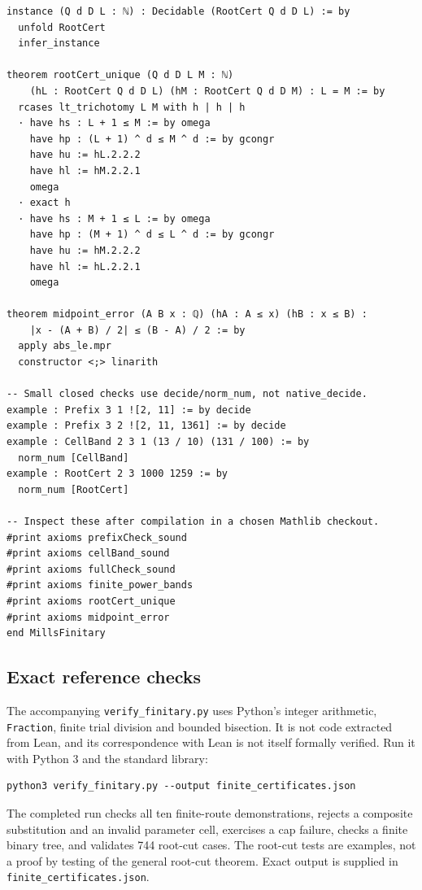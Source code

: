 \documentclass[11pt,reqno]{amsart}
\theoremstyle{blueplain}
\numberwithin{equation}{section}
\begin{document}
\begin{lstlisting}[style=lean,basicstyle=\ttfamily\scriptsize,numberstyle=\scriptsize]
instance (Q d D L : ℕ) : Decidable (RootCert Q d D L) := by
  unfold RootCert
  infer_instance

theorem rootCert_unique (Q d D L M : ℕ)
    (hL : RootCert Q d D L) (hM : RootCert Q d D M) : L = M := by
  rcases lt_trichotomy L M with h | h | h
  · have hs : L + 1 ≤ M := by omega
    have hp : (L + 1) ^ d ≤ M ^ d := by gcongr
    have hu := hL.2.2.2
    have hl := hM.2.2.1
    omega
  · exact h
  · have hs : M + 1 ≤ L := by omega
    have hp : (M + 1) ^ d ≤ L ^ d := by gcongr
    have hu := hM.2.2.2
    have hl := hL.2.2.1
    omega

theorem midpoint_error (A B x : ℚ) (hA : A ≤ x) (hB : x ≤ B) :
    |x - (A + B) / 2| ≤ (B - A) / 2 := by
  apply abs_le.mpr
  constructor <;> linarith

-- Small closed checks use decide/norm_num, not native_decide.
example : Prefix 3 1 ![2, 11] := by decide
example : Prefix 3 2 ![2, 11, 1361] := by decide
example : CellBand 2 3 1 (13 / 10) (131 / 100) := by
  norm_num [CellBand]
example : RootCert 2 3 1000 1259 := by
  norm_num [RootCert]

-- Inspect these after compilation in a chosen Mathlib checkout.
#print axioms prefixCheck_sound
#print axioms cellBand_sound
#print axioms fullCheck_sound
#print axioms finite_power_bands
#print axioms rootCert_unique
#print axioms midpoint_error
end MillsFinitary
\end{lstlisting}
\subsection{Exact reference checks}\label{fin:sec:scripts-python}
The accompanying \texttt{verify\_finitary.py} uses Python's integer arithmetic,
\texttt{Fraction}, finite trial division and bounded bisection. It is not
code extracted from Lean, and its correspondence with Lean is not itself
formally verified. Run it with Python 3 and the standard library:
\begin{lstlisting}[basicstyle=\ttfamily\scriptsize,numberstyle=\scriptsize]
python3 verify_finitary.py --output finite_certificates.json
\end{lstlisting}
The completed run checks all ten finite-route demonstrations, rejects a
composite substitution and an invalid parameter cell, exercises a cap
failure, checks a finite binary tree, and validates 744 root-cut cases.
The root-cut tests are examples, not a proof by testing of the general
root-cut theorem. Exact output is supplied in \texttt{finite\_certificates.json}.
\end{document}
